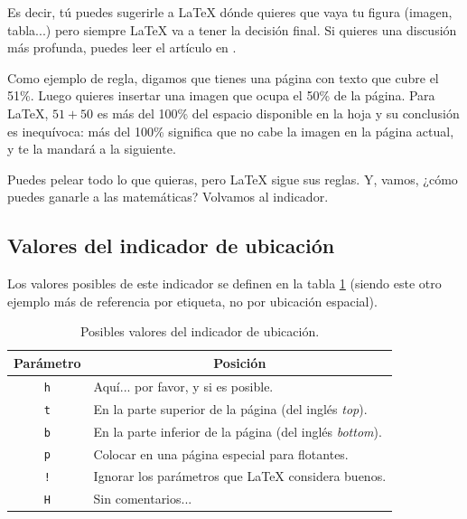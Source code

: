 Es decir, tú puedes sugerirle a \LaTeX{} dónde quieres que vaya tu figura (imagen, tabla...) pero siempre \LaTeX{} va a tener la decisión final. Si quieres una discusión más profunda, puedes leer el artículo en \cite{bib:figures_float}.

Como ejemplo de regla, digamos que tienes una página con texto que cubre el 51\%. Luego quieres insertar una imagen que ocupa el 50\% de la página. Para \LaTeX{}, $51 + 50$ es más del 100\% del espacio disponible en la hoja y su conclusión es inequívoca: más del 100\% significa que no cabe la imagen en la página actual, y te la mandará a la siguiente.

Puedes pelear todo lo que quieras, pero \LaTeX{} sigue sus reglas. Y, vamos, ¿cómo puedes ganarle a las matemáticas? Volvamos al indicador.



\subsection{Valores del indicador de ubicación}
\label{sub:valores_del_indicador_de_ubicacion}



Los valores posibles de este indicador se definen en la tabla \ref{tab:indicador_ubicacion} (siendo este otro ejemplo más de referencia por etiqueta, no por ubicación espacial).

\begin{table}[ht]
	\centering
	\begin{tabular}{cl}
		\hline
		\textbf{Parámetro} & \multicolumn{1}{c}{\textbf{Posición}}                         \\
		\hline
		\texttt{h}         & Aquí... por favor, y si es posible.                           \\
		\texttt{t}         & En la parte superior de la página (del inglés \emph{top}).    \\
		\texttt{b}         & En la parte inferior de la página (del inglés \emph{bottom}). \\
		\texttt{p}         & Colocar en una página especial para flotantes.                \\
		\texttt{!}         & Ignorar los parámetros que \LaTeX{} considera buenos.         \\
		\texttt{H}         & Sin comentarios...                                            \\
		\hline
	\end{tabular}
	\caption{Posibles valores del indicador de ubicación.} %
	\label{tab:indicador_ubicacion}
\end{table}

